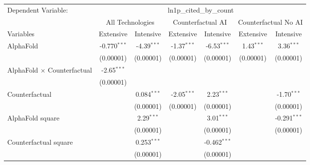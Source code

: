 \begingroup
\centering
\begin{tabular}{lcccccc}
   \tabularnewline \midrule \midrule
   Dependent Variable: & \multicolumn{6}{c}{ln1p\_cited\_by\_count}\\
 & \multicolumn{2}{c}{All Technologies} & \multicolumn{2}{c}{Counterfactual AI} & \multicolumn{2}{c}{Counterfactual No AI} \\
\cmidrule(lr){1-1}\cmidrule(lr){2-3} \cmidrule(lr){4-5} \cmidrule(lr){6-7}
Variables & \multicolumn{1}{c}{Extensive} & \multicolumn{1}{c}{Intensive} & \multicolumn{1}{c}{Extensive} & \multicolumn{1}{c}{Intensive} & \multicolumn{1}{c}{Extensive} & \multicolumn{1}{c}{Intensive} \\
\cmidrule(lr){1-1}\cmidrule(lr){2-2} \cmidrule(lr){3-3} \cmidrule(lr){4-4} \cmidrule(lr){5-5} \cmidrule(lr){6-6} \cmidrule(lr){7-7}
   AlphaFold                          & -0.770$^{***}$ & -4.39$^{***}$ & -1.37$^{***}$ & -6.53$^{***}$  & 1.43$^{***}$ & 3.36$^{***}$\\   
                                      & (0.00001)      & (0.00001)     & (0.00001)     & (0.00001)      & (0.00001)    & (0.00001)\\   
   AlphaFold $\times$ Counterfactual  & -2.65$^{***}$  &               &               &                &              &   \\   
                                      & (0.00001)      &               &               &                &              &   \\   
   Counterfactual                     &                & 0.084$^{***}$ & -2.05$^{***}$ & 2.23$^{***}$   &              & -1.70$^{***}$\\   
                                      &                & (0.00001)     & (0.00001)     & (0.00001)      &              & (0.00001)\\   
   AlphaFold square                   &                & 2.29$^{***}$  &               & 3.01$^{***}$   &              & -0.291$^{***}$\\   
                                      &                & (0.00001)     &               & (0.00001)      &              & (0.00001)\\   
   Counterfactual square              &                & 0.253$^{***}$ &               & -0.462$^{***}$ &              &   \\   
                                      &                & (0.00001)     &               & (0.00001)      &              &   \\   
   \midrule

\end{tabular}
